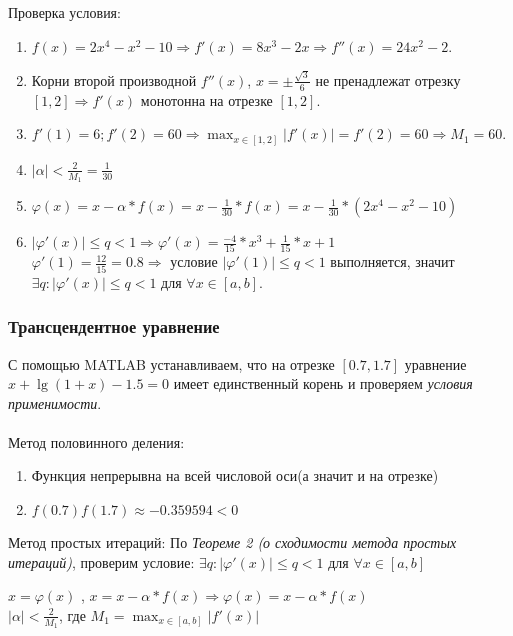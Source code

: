 \documentclass{article}
\begin{document}
	Проверка  условия:  
	\begin{enumerate}
	\item $f(x) = 2x^4 -x^2 -10\Rightarrow f'(x) = 8x^3 -2x \Rightarrow f''(x) = 24x^2 -2$.
	\item Корни второй производной $f''(x)$, $ x = \pm \frac{\sqrt{3}} {6}$ не пренадлежат отрезку$[1, 2] \Rightarrow f'(x)$ монотонна на отрезке $[1, 2]$.
	\item $f'(1) = 6; f'(2) = 60 \Rightarrow \max_{x \in{[1, 2]}} |f'(x)| = f'(2) = 60 \Rightarrow M_1 = 60 $.
	\item $|\alpha| < \frac{2} {M_1} = \frac{1}{30}$
	\item $\varphi(x) = x - \alpha*f(x) = x -  \frac{1}{30} * f(x) = x - \frac{1}{30} * (2x^4 - x^2 -10) $
	\item $|\varphi'(x)|\leq q<1 \Rightarrow \varphi'(x) = \frac{-4}{15}*x^3 + \frac{1}{15}*x +1 $
	~\\
	$\varphi'(1) = \frac{12}{15} = 0.8 \Rightarrow$ условие $|\varphi'(1)|\leq q<1$ выполняется, значит $\exists q: |\varphi'(x)|\leq q<1$ для $\forall x \in [a, b]$.
	\end{enumerate}


	\subsubsection{Трансцендентное уравнение}
	С помощью MATLAB устанавливаем, что на отрезке $[0.7, 1.7]$ уравнение $x + \lg{(1+x)}-1.5=0$ имеет единственный корень и проверяем \emph{условия применимости}.
	~\\
	~\\
	Метод половинного деления:
	\begin{enumerate}
		\item Функция непрерывна на всей числовой оси(а значит и на отрезке)
		\item $f(0.7)f(1.7)\approx -0.359594 < 0$
	\end{enumerate}
	Метод простых итераций:
	По \emph{ Теореме 2 (о сходимости метода простых итераций)}, проверим условие: 
		$\exists q: |\varphi'(x)|\leq q<1$ для $\forall x \in [a, b]$

	$x = \varphi(x)$ , $x = x - \alpha*f(x) \Rightarrow \varphi(x) = x - \alpha * f(x)$
	~\\
	$|\alpha| < \frac{2} {M_1}$, где $M_1 = \max_{x \in{[a, b]}} |f'(x)|$
	~\\
	~\\
	
\end{document}
